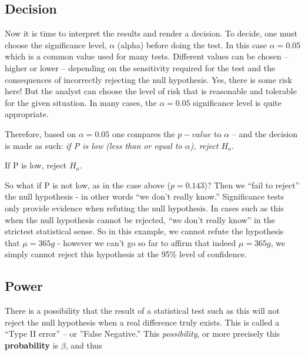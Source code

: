 \subsection{Decision}
Now it is time to interpret the results and render a decision.  To decide, one must choose the significance level, $\alpha$ (alpha) before doing the test.  In this case $\alpha = 0.05$ which is a common value used for many tests.  Different values can be chosen -- higher or lower -- depending on the sensitivity required for the test and the consequences of incorrectly rejecting the null hypothesis.  Yes, there is some risk here!  But the analyst can choose the level of risk that is reasonable and tolerable for the given situation.  In many cases, the $\alpha = 0.05$ significance level is quite appropriate.

Therefore, based on $\alpha = 0.05$ one compares the $p-value$ to $\alpha$ -- and the decision is made as such: \textit{if P is low (less than or equal to $\alpha$), reject $H_{o}$.}

\begin{center}
\LARGE If P is low, reject $H_{o}$.
\end{center}
So what if P is not low, as in the case above ($p = 0.143$)?  Then we ``fail to reject'' the null hypothesis - in other words ``we don't really know.''  Significance tests only provide evidence when refuting the null hypothesis.  In cases such as this when the null hypothesis cannot be rejected, ``we don't really know'' in the strictest statistical sense. So in this example, we cannot refute the hypothesis that  $ \mu = 365 g $ - however we can't go so far to affirm that indeed  $ \mu = 365 g $, we simply cannot reject this hypothesis at the 95\% level of confidence.\\

\subsection{Power}
There is a possibility that the result of a statistical test such as this will not reject the null hypothesis when a real difference truly exists.  This is called a ``Type II error'' -- or ''False Negative.''  This \textit{possibility}, or more precisely this \textbf{probability} is $ \beta $, and thus

